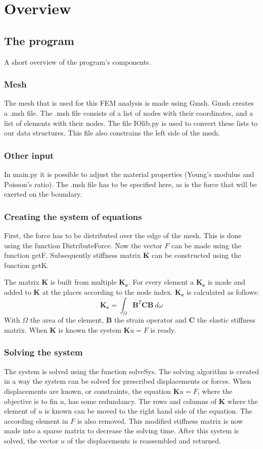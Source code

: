 \chapter{Overview}

\section{The program}
A short overview of the program's components.

\subsection{Mesh}
The mesh that is used for this FEM analysis is made using Gmsh. Gmsh creates a .msh file. The .msh file consists of a list of nodes with their coordinates, and a list of elements with their nodes. The file IOlib.py is used to convert these lists to our data structures. This file also constrains the left side of the mesh. 
\subsection{Other input}
In main.py it is possible to adjust the material properties (Young's modulus and Poisson's ratio). The .msh file has to be specified here, as is the force that will be exerted on the boundary. 
\subsection{Creating the system of equations}
First, the force has to be distributed over the edge of the mesh. This is done using the function Distribute\textunderscore Force. Now the vector $F$ can be made using the function getF. Subsequently stiffness matrix $\mathbf{K}$ can be constructed using the function getK. 

The matrix $\mathbf{K}$ is built from multiple $\mathbf{K_e}$. For every element a $\mathbf{K_e}$ is made and added to $\mathbf{K}$ at the places according to the node index. $\mathbf{K_e}$ is calculated as follows:
\begin{equation}
\mathbf{K_e} = \int_\Omega \mathbf{B}^T \mathbf{C} \mathbf{B} \ d\omega
\end{equation}
With $\Omega$ the area of the element, $\mathbf{B}$ the strain operator and $\mathbf{C}$ the elastic stiffness matrix.  When $\mathbf{K}$ is known the system $\mathbf{K} u = F$ is ready.
\subsection{Solving the system}
The system is solved using the function solveSys. The solving algorithm is created in a way the system can be solved for prescribed displacements or forces. When displacements are known, or constraints, the equation $\mathbf{K} u = F$, where the objective is to fin $u$, has some redundancy. The rows and columns of $\mathbf{K}$ where the element of $u$ is known can be moved to the right hand side  of the equation. The according element in $F$ is also removed.
This modified stiffness matrix is now made into a sparse matrix to decrease the solving time. After this system is solved, the vector $u$ of the displacements is reassembled and returned. 

